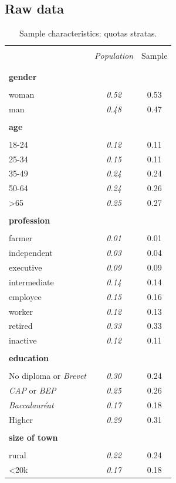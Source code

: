 \documentclass[english,5p,authoryear]{elsarticle}
\renewcommand*\thetable{\Roman{table}}
\begin{document}
\begin{appendices}
\renewcommand{\thetable}{\Alph{section}.\arabic{table}}

\section{Raw data\label{app:Raw-Data}}

\begin{table}[!htbp]
\label{table:sample_characteristics}
\caption{\label{tab:Sample-Characteristics}Sample characteristics: quotas stratas.}
\centering
\begin{tabular}{lcc}
\hline \hline  \\[-1.8ex]
 & \textit{Population} & Sample  \tabularnewline \\[-1.8ex]
\hline  \\[-1.8ex]
\textbf{gender} & & \tabularnewline  \\[-1.8ex]
woman & \textit{0.52} & 0.53\tabularnewline
man & \textit{0.48} & 0.47\tabularnewline
\hline \\[-1.8ex]
\textbf{age} &  & \tabularnewline  \\[-1.8ex]
18-24 & \textit{0.12} & 0.11\tabularnewline
25-34 & \textit{0.15} & 0.11\tabularnewline
35-49 & \textit{0.24} & 0.24\tabularnewline
50-64 & \textit{0.24} & 0.26\tabularnewline
>65 & \textit{0.25} & 0.27\tabularnewline
\hline \\[-1.8ex]
\textbf{profession} &  & \tabularnewline  \\[-1.8ex]
farmer & \textit{0.01} & 0.01\tabularnewline
independent & \textit{0.03} & 0.04\tabularnewline
executive & \textit{0.09} & 0.09\tabularnewline
intermediate & \textit{0.14} & 0.14\tabularnewline
employee & \textit{0.15} & 0.16\tabularnewline
worker & \textit{0.12} & 0.13\tabularnewline
retired & \textit{0.33} & 0.33\tabularnewline
inactive & \textit{0.12} & 0.11\tabularnewline
\hline  \\[-1.8ex]
\textbf{education} &  & \tabularnewline  \\[-1.8ex]
No diploma or \textit{Brevet} & \textit{0.30} & 0.24\tabularnewline
\textit{CAP} or \textit{BEP} & \textit{0.25} & 0.26\tabularnewline
\textit{Baccalauréat} & \textit{0.17} & 0.18\tabularnewline
Higher & \textit{0.29} & 0.31\tabularnewline
\hline  \\[-1.8ex]
\textbf{size of town} &  & \tabularnewline  \\[-1.8ex]
rural & \textit{0.22} & 0.24\tabularnewline
<20k & \textit{0.17} & 0.18\tabularnewline

\end{tabular}
\end{table}
\end{appendices}
\end{document}
